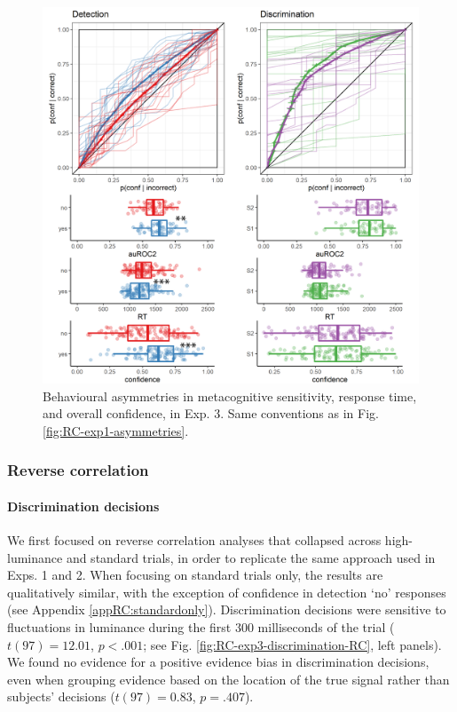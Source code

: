 \documentclass[12pt,twoside]{reedthesis}
\begin{document}
\begin{figure}
\includegraphics[width=\textwidth]{figure/RC/RC-exp3-asymmetries-enhanced} \caption[Behavioural asymmetries in metacognitive sensitivity, response time, and overall confidence, in Exp. 3]{Behavioural asymmetries in metacognitive sensitivity, response time, and overall confidence, in Exp. 3. Same conventions as in Fig. \ref{fig:RC-exp1-asymmetries}.}\label{fig:RC-exp3-asymmetries}
\end{figure}
\hypertarget{reverse-correlation-2}{%
\subsubsection{Reverse correlation}\label{reverse-correlation-2}}

\hypertarget{discrimination-decisions-1}{%
\paragraph{Discrimination decisions}\label{discrimination-decisions-1}}

We first focused on reverse correlation analyses that collapsed across high-luminance and standard trials, in order to replicate the same approach used in Exps. 1 and 2. When focusing on standard trials only, the results are qualitatively similar, with the exception of confidence in detection `no' responses (see Appendix \ref{appRC:standardonly}). Discrimination decisions were sensitive to fluctuations in luminance during the first 300 milliseconds of the trial (\(t(97) = 12.01\), \(p < .001\); see Fig. \ref{fig:RC-exp3-discrimination-RC}, left panels). We found no evidence for a positive evidence bias in discrimination decisions, even when grouping evidence based on the location of the true signal rather than subjects' decisions (\(t(97) = 0.83\), \(p = .407\)).
\end{document}
